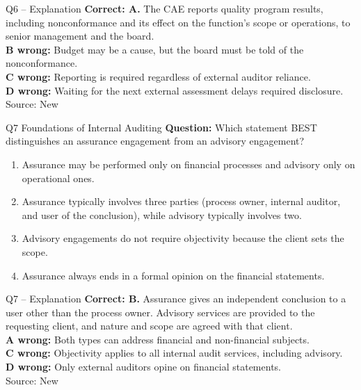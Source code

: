 \documentclass[aspectratio=169,10pt]{beamer}
\begin{document}
\begin{frame}[t]{Q6 -- Explanation}
	\footnotesize
	\textbf{Correct: A.} The CAE reports quality program results, including nonconformance and its effect on the function's scope or operations, to senior management and the board. \\[5pt]
\textbf{B wrong:} Budget may be a cause, but the board must be told of the nonconformance. \\[3pt]
\textbf{C wrong:} Reporting is required regardless of external auditor reliance. \\[3pt]
\textbf{D wrong:} Waiting for the next external assessment delays required disclosure. \\[3pt]
	\vfill {\tiny Source: New}
\end{frame}

\begin{frame}[t]{Q7 \hfill {\scriptsize Foundations of Internal Auditing}}
	\small
	\textbf{Question:} Which statement BEST distinguishes an assurance engagement from an advisory engagement?
	\begin{enumerate}[label=\Alph*.,itemsep=1pt,topsep=3pt]
			\item Assurance may be performed only on financial processes and advisory only on operational ones.
			\item Assurance typically involves three parties (process owner, internal auditor, and user of the conclusion), while advisory typically involves two.
			\item Advisory engagements do not require objectivity because the client sets the scope.
			\item Assurance always ends in a formal opinion on the financial statements.
	\end{enumerate}
\end{frame}

\begin{frame}[t]{Q7 -- Explanation}
	\footnotesize
	\textbf{Correct: B.} Assurance gives an independent conclusion to a user other than the process owner. Advisory services are provided to the requesting client, and nature and scope are agreed with that client. \\[5pt]
\textbf{A wrong:} Both types can address financial and non-financial subjects. \\[3pt]
\textbf{C wrong:} Objectivity applies to all internal audit services, including advisory. \\[3pt]
\textbf{D wrong:} Only external auditors opine on financial statements. \\[3pt]
	\vfill {\tiny Source: New}
\end{frame}
\end{document}
